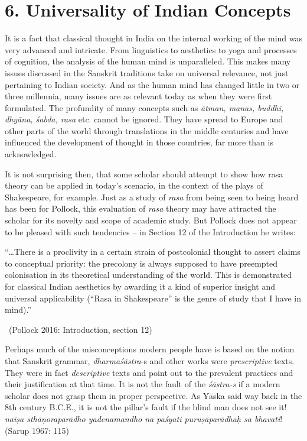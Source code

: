 \vspace{-.3cm}

\section*{6. Universality of Indian Concepts}

It is a fact that classical thought in India on the internal working of the mind was very advanced and intricate. From linguistics to aesthetics to yoga and processes of cognition, the analysis of the human mind is unparalleled. This makes many issues discussed in the Sanskrit traditions take on universal relevance, not just pertaining to Indian society. And as the human mind has changed little in two or three millennia, many issues are as relevant today as when they were first formulated. The profundity of many concepts such as \textit{ātman, manas, buddhi, dhyāna, śabda, rasa} etc. cannot be ignored. They have spread to Europe and other parts of the world through translations in the middle centuries and have influenced the development of thought in those countries, far more than is acknowledged.

It is not surprising then, that some scholar should attempt to show how rasa theory can be applied in today’s scenario, in the context of the plays of Shakespeare, for example. Just as a study of \textit{rasa} from being seen to being heard has been for Pollock, this evaluation of \textit{rasa} theory may have attracted the scholar for its novelty and scope of academic study. But Pollock does not appear to be pleased with such tendencies – in Section 12 of the Introduction he writes:

\begin{myquote}
“…There is a proclivity in a certain strain of postcolonial thought to assert claims to conceptual priority: the precolony is always supposed to have preempted colonisation in its theoretical understanding of the world. This is demonstrated for classical Indian aesthetics by awarding it a kind of superior insight and universal applicability (“Rasa in Shakespeare” is the genre of study that I have in mind).” 

~\hfill (Pollock 2016: Introduction, section 12)
\end{myquote}

Perhaps much of the misconceptions modern people have is based on the notion that Sanskrit grammar, \textit{dharmaśāstra}-s and other works were \textit{prescriptive} texts. They were in fact \textit{descriptive} texts and point out to the prevalent practices and their justification at that time. It is not the fault of the \textit{śāstra-s} if a modern scholar does not grasp them in proper perspective. As Yāska said way back in the 8th century B.C.E., it is not the pillar’s fault if the blind man does not see it! \textit{naiṣa sthāṇoraparādho yadenamandho na paśyati  puruṣāparādhaḥ sa bhavati}! (Sarup 1967: 115)


